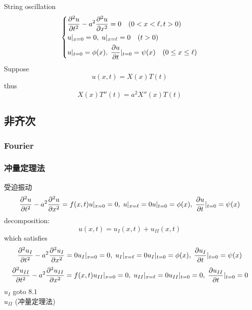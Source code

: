\documentclass[UTF8]{ctexart} %
\numberwithin{equation}{section}
\begin{document}
\subsection{}
String oscillation
\begin{equation}\label{key}
\left\{
\begin{aligned}
&\pdv[2]{u}{t} - a^2\pdv[2]{u}{x} = 0 \quad (0 < x <\ell, t>0)\\
&u|_{x=0} = 0,\; u|_{x=\ell} = 0 \quad (t>0)\\
&u|_{t=0} = \phi(x),\; \pdv{u}{t}|_{t=0} = \psi(x) \quad(0\leq x\leq \ell)
\end{aligned}\right.
\end{equation}
Suppose
\begin{equation}\label{key}
u(x,t) = X(x)T(t)
\end{equation}
thus
\begin{equation}\label{key}
X(x)T''(t) = a^2 X''(x)T(t)
\end{equation}


\subsection{非齐次}
\subsubsection{Fourier}

\subsubsection{冲量定理法}
受迫振动
\begin{equation}\label{key}
\pdv[2]{u}{t} - a^2\pdv[2]{u}{x} = f(x,t)\\
u|_{x=0} = 0,\; u|_{x=\ell} = 0\\
u|_{t=0} = \phi(x),\; \pdv{u}{t}|_{t=0} = \psi(x)
\end{equation}
decomposition:
\begin{equation}\label{key}
u(x,t) = u_I(x,t) + u_{II}(x,t)
\end{equation}
which satisfies
\begin{equation}\label{key}
\pdv[2]{u_I}{t} - a^2\pdv[2]{u_I}{x} = 0\\
u_I|_{x=0} = 0,\; u_I|_{x=\ell} = 0\\
u_I|_{t=0} = \phi(x),\; \pdv{u_I}{t}|_{t=0} = \psi(x)
\end{equation}
\begin{equation}\label{key}
\pdv[2]{u_{II}}{t} - a^2\pdv[2]{u_{II}}{x} = f(x,t)\\
u_{II}|_{x=0} = 0,\; u_{II}|_{x=\ell} = 0\\
u_{II}|_{t=0} = 0,\; \pdv{u_{II}}{t}|_{t=0} = 0
\end{equation}
$u_I$ goto $8.1$\\
$u_{II}$ (冲量定理法)\\
\end{document}
